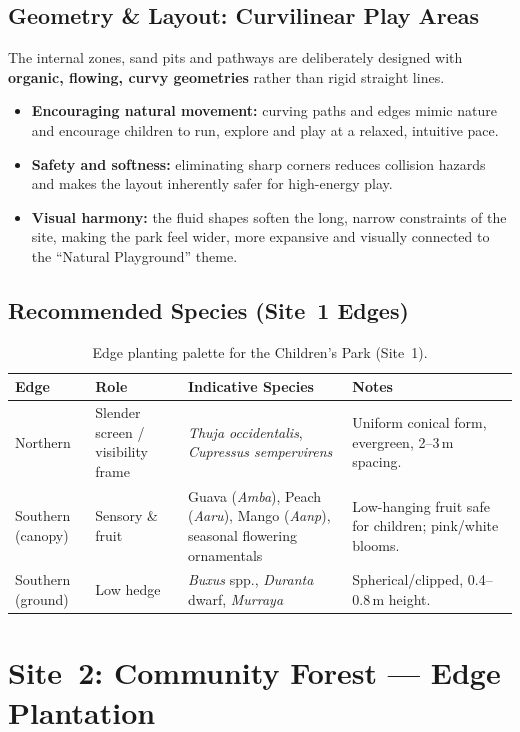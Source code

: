 \documentclass[11pt,a4paper]{article}
\begin{document}
\subsection{Geometry \& Layout: Curvilinear Play Areas}
The internal zones, sand pits and pathways are deliberately designed with \textbf{organic, flowing, curvy geometries} rather than rigid straight lines.
\begin{itemize}
  \item \textbf{Encouraging natural movement:} curving paths and edges mimic nature and encourage children to run, explore and play at a relaxed, intuitive pace.
  \item \textbf{Safety and softness:} eliminating sharp corners reduces collision hazards and makes the layout inherently safer for high-energy play.
  \item \textbf{Visual harmony:} the fluid shapes soften the long, narrow constraints of the site, making the park feel wider, more expansive and visually connected to the ``Natural Playground'' theme.
\end{itemize}

\subsection{Recommended Species (Site~1 Edges)}
\begin{table}[H]
\centering
\small
\begin{tabularx}{\linewidth}{L{2.4cm} L{3.0cm} L{3.6cm} X}
\toprule
\textbf{Edge} & \textbf{Role} & \textbf{Indicative Species} & \textbf{Notes} \\
\midrule
Northern & Slender screen / visibility frame & \emph{Thuja occidentalis}, \emph{Cupressus sempervirens} & Uniform conical form, evergreen, 2--3\,m spacing. \\
Southern (canopy) & Sensory \& fruit & Guava (\emph{Amba}), Peach (\emph{Aaru}), Mango (\emph{Aanp}), seasonal flowering ornamentals & Low-hanging fruit safe for children; pink/white blooms. \\
Southern (ground) & Low hedge & \emph{Buxus} spp., \emph{Duranta} dwarf, \emph{Murraya} & Spherical/clipped, 0.4--0.8\,m height. \\
\bottomrule
\end{tabularx}
\caption{Edge planting palette for the Children's Park (Site~1).}
\end{table}

\section{Site~2: Community Forest --- Edge Plantation}
\label{sec:site2}
\end{document}
